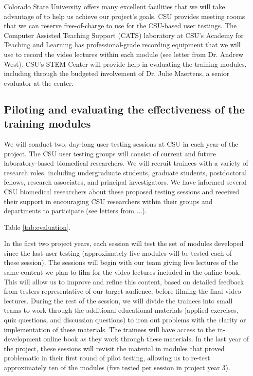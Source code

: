 \documentclass[pdftex,english,11pt,parskip=half]{scrartcl}
\begin{document}
Colorado State University offers many excellent facilities that we will take
advantage of to help us achieve our project's goals. CSU provides meeting rooms
that we can reserve free-of-charge to use for the CSU-based user testings. The
Computer Assisted Teaching Support (CATS) laboratory at CSU's Academy for
Teaching and Learning has professional-grade recording equipment that we will
use to record the video lectures within each module (see letter from Dr. Andrew
West). CSU's STEM Center will provide help in evaluating the training modules,
including through the budgeted involvement of Dr. Julie Maertens, a senior
evaluator at the center. 

\subsection{Piloting and evaluating the effectiveness of the training modules}

We will conduct two, day-long user testing sessions at CSU in each year of the
project. The CSU user testing groups will consist of current and future
laboratory-based biomedical researchers. We will recruit trainees with a variety
of research roles, including undergraduate students, graduate students,
postdoctoral fellows, research associates, and principal investigators. We have
informed several CSU biomedical researchers about these proposed testing
sessions and received their support in encouraging CSU researchers within their
groups and departments to participate (see letters from ...). 

Table \ref{tab:evaluation}.

In the first two project years, each session will test the set of modules
developed since the last user testing (approximately five modules will be tested
each of these session). The sessions will begin with our team giving live
lectures of the same content we plan to film for the video lectures included in
the online book. This will allow us to improve and refine this content, based on
detailed feedback from testers representative of our target audience, before
filming the final video lectures. During the rest of the session, we will divide
the trainees into small teams to work through the additional educational
materials (applied exercises, quiz questions, and discussion questions) to iron
out problems with the clarity or implementation of these materials. The trainees
will have access to the in-development online book as they work through these
materials. In the last year of the project, these sessions will revisit the material
in modules that proved problematic in their first round of pilot testing, allowing us
to re-test approximately ten of the modules (five tested per session in project year 3).
\end{document}
